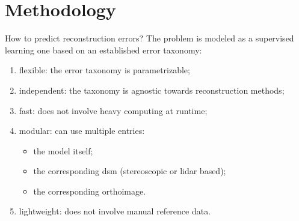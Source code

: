 \documentclass{beamer}
\begin{document}
    \section{Methodology}
        \begin{frame}{How to predict reconstruction errors?}
            The problem is modeled as a supervised learning one based on an established error taxonomy:
            \begin{enumerate}[label = (\roman*)., font=\color{IGNGreen}]
                \item<2-> flexible: the error taxonomy is parametrizable;
                \item<3-> independent: the taxonomy is agnostic towards reconstruction methods;
                \item<4-> fast: does not involve heavy computing at runtime;
                \item<5-> modular: can use multiple entries:
                \begin{itemize}[label=--]
                    \item<6-> the model itself;
                    \item<7-> the corresponding \gls{dsm} (stereoscopic or \gls{lidar} based);
                    \item<8-> the corresponding orthoimage.
                \end{itemize}
                \item<9-> lightweight: does not involve manual reference data.
            \end{enumerate}
        \end{frame}
\end{document}
